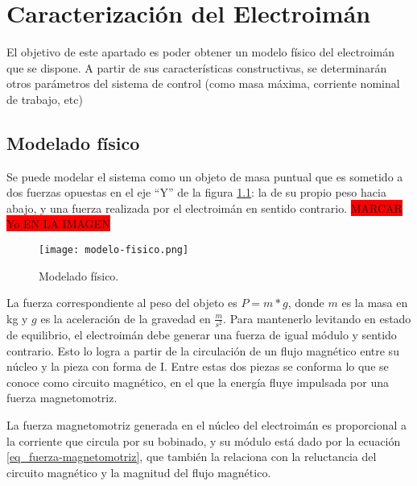 \chapter{Caracterización del  Electroimán}  \label{cap:CaracterizaciónElectroimán}

El objetivo de este apartado es poder obtener un modelo físico del electroimán que se dispone. A partir de sus características constructivas, se determinarán otros parámetros del sistema de control (como masa máxima, corriente nominal de trabajo, etc)


\section{Modelado físico}




\noindent Se puede modelar el sistema como un objeto de masa puntual que es sometido a dos fuerzas opuestas en el eje “Y” de la figura \ref{fig:img_modelado-fisico}: la de su propio peso hacia abajo, y una fuerza realizada por el electroimán en sentido contrario. \colorbox{red}{MARCAR Yo EN LA IMAGEN}

\begin{figure}[H]
	\centering
	\texttt{[image: modelo-fisico.png]}
	\caption{Modelado físico.}
	\label{fig:img_modelado-fisico}
\end{figure}

\noindent La fuerza correspondiente al peso del objeto es $P=m*g$, donde $m$ es la masa en kg y $g$ es la aceleración de la gravedad en $\frac{m}{s^{2}}$. Para mantenerlo levitando en estado de equilibrio, el electroimán debe generar una fuerza de igual módulo y sentido contrario. Esto lo logra a partir de la circulación de un flujo magnético entre su núcleo y la pieza con forma de I. Entre estas dos piezas se conforma lo que se conoce como circuito magnético, en el que la energía fluye impulsada por una fuerza magnetomotriz.

\noindent La fuerza magnetomotriz generada en el núcleo del electroimán es proporcional a la corriente que circula por su bobinado, y su módulo está dado por la ecuación \ref{eq_fuerza-magnetomotriz}, que también la relaciona con la reluctancia del circuito magnético y la magnitud del flujo magnético.

